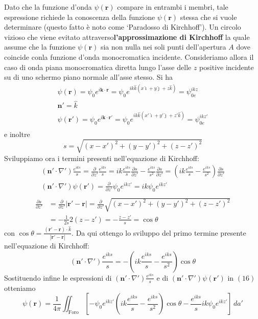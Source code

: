 Dato che la funzione d'onda \(\psi(\bm{r})\) compare in entrambi i
membri, tale espressione richiede la conoscenza della funzione
\(\psi(\bm{r})\) stessa che si vuole determinare (questo fatto è noto
come `Paradosso di Kirchhoff'). Un circolo vizioso che viene evitato
attraverso\textbf{l'approssimazione di Kirchhoff} la quale assume che la
funzione \(\psi(\bm{r})\) sia non nulla nei soli punti dell'apertura
\(A\) dove coincide conla funzione d'onda monocromatica incidente.
Consideriamo allora il caso di onda piana monocromatica diretta lungo
l'asse delle \(z\) positive incidente su di uno schermo piano normale
all'asse stesso. Si ha
\begin{gather*}
	\psi(\bm{r}) = \psi_0 e^{i \bm{k} \cdot \bm{r}}= \psi_0e^{ik \hat{k}(x \hat{\imath}+y \hat{\jmath}+z \hat{k})}= \psi_{0e}^{ikz}\\
	\bm{n}' = \hat{k}\\
	\psi(\bm{r'}) = \psi_0 e^{i \bm{k} \cdot \bm{r'}}= \psi_0e^{ik \hat{k}(x' \hat{\imath}+y' \hat{\jmath}+z' \hat{k})}= \psi_{0e}^{ikz'}\\
\end{gather*}
e inoltre
\[
	s = \sqrt{(x-x')^2+(y-y')^2+(z-z')^2}
\]
Sviluppiamo ora i termini presenti nell'equazione di Kirchhoff:
\begin{gather*}
	(\bm{n}' \cdot \nabla')\frac{e^{iks}}{s} = \frac{\partial}{\partial z'}\frac{e^{iks}}{s} = ik \frac{e^{iks}}{s}\frac{\partial s}{\partial z'} - \frac{e^{iks}}{s^2}\frac{\partial s}{\partial z'}  = \left( ik \frac{e^{iks}}{s}- \frac{e^{iks}}{s^2} \right)\frac{\partial s}{\partial z'}\\
	(\bm{n}' \cdot \nabla')\psi(\bm{r'}) = \frac{\partial}{\partial z'}\psi_0e^{ikz'}=ik\psi_0e^{ikz'}\\
\end{gather*}
\begin{align*}
	\frac{\partial s}{\partial z'} & = \frac{\partial }{\partial z'}|\bm{r'}-\bm{r}| = \frac{\partial }{\partial z'}\sqrt{(x-x')^2+(y-y')^2+(z-z')^2} \\
	                               & = - \frac{1}{2s}2(z-z') = - \frac{z-z'}{s} = \cos \theta
\end{align*}
con $\cos \theta = \frac{ (\bm{r'}-\bm{r})\cdot \hat{k}}{|\bm{r'}-\bm{r}|}$.
Da qui ottengo lo sviluppo del primo termine presente nell'equazione di Kirchhoff:
\[
	(\bm{n}' \cdot \nabla')\frac{e^{iks}}{s} = -\left(ik\frac{e^{iks}}{s}-\frac{e^{iks}}{s^2}\right) \cos \theta
\]
Sostituendo infine le espressioni di $(\bm{n}' \cdot \nabla ') \frac{e^{iks}}{s}$ e di $(\bm{n}' \cdot \nabla')\psi(\bm{r'})$ in $(16)$ otteniamo
\[
	\psi(\bm{r}) = \frac{1}{4 \pi} \iint_{\text{Foro}} \left[-\psi_0 e^{ikz'}\left( ik\frac{e^{iks}}{s}-\frac{e^{iks}}{s^2}\right) \cos \theta - \frac{e^{iks}}{s} ik\psi_0 e^{ikz'} \right] \, da'
\]

